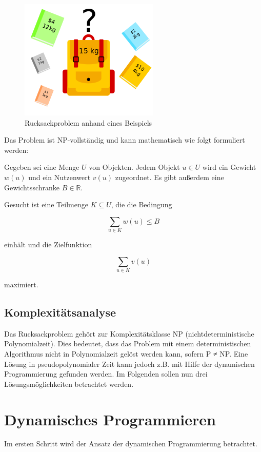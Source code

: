 \documentclass[12pt]{report}
\begin{document}
\begin{figure}[h]
	\centering
	\includegraphics[width=0.5 \linewidth]{Knapsack_Problem_Illustration}
	\caption{Rucksackproblem anhand eines Beispiels \cite{VectorVoyager2023knapsack}}
	\label{fig:rucksackproblem}
\end{figure}

Das Problem ist NP-vollständig und kann mathematisch wie folgt formuliert werden:

Gegeben sei eine Menge $U$ von Objekten. Jedem Objekt $u \in U$ wird ein Gewicht $w(u)$ und ein Nutzenwert $v(u)$ zugeordnet. Es gibt außerdem eine Gewichtsschranke $B \in \mathbb{R}$.

Gesucht ist eine Teilmenge $K \subseteq U$, die die Bedingung

$$\sum_{u \in K} w(u) \leq B$$

einhält und die Zielfunktion

$$\sum_{u \in K} v(u)$$

maximiert. \cite{kellerer2004knapsack}

\section{Komplexitätsanalyse}
Das Rucksackproblem gehört zur Komplexitätsklasse NP (nichtdeterministische Polynomialzeit). Dies bedeutet, dass das Problem mit einem deterministischen Algorithmus nicht in Polynomialzeit gelöst werden kann, sofern P ≠ NP. Eine Lösung in pseudopolynomialer Zeit kann jedoch z.B. mit Hilfe der dynamischen Programmierung gefunden werden. \cite{assi8672677}
Im Folgenden sollen nun drei Lösungsmöglichkeiten betrachtet werden.

\newpage
\chapter{Dynamisches Programmieren}
Im ersten Schritt wird der Ansatz der dynamischen Programmierung betrachtet.
\end{document}
